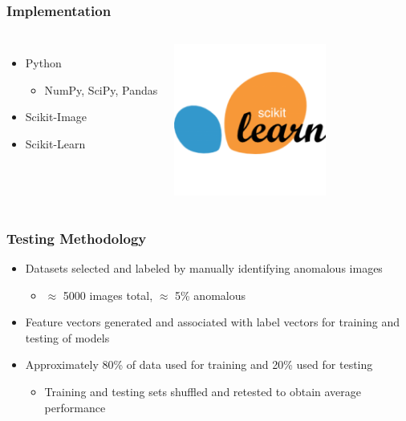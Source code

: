 \documentclass{beamer}
\begin{document}
\begin{frame}
\frametitle{Implementation}
\begin{columns}
\begin{itemize}
  \item Python
  \begin{itemize}
    \item NumPy, SciPy, Pandas
  \end{itemize}
  \item Scikit-Image
  \item Scikit-Learn
\end{itemize}
\includegraphics[width = 5cm]{Figures/scikit}
\end{columns}
\end{frame}


\begin{frame}
\frametitle{Testing Methodology}
\begin{itemize}
  \item Datasets selected and labeled by manually identifying anomalous images
  \begin{itemize}
    \item $\approx$ 5000 images total, $\approx$ 5\% anomalous
  \end{itemize}
  \item Feature vectors generated and associated with label vectors for training and testing of models
  \item Approximately 80\% of data used for training and 20\% used for testing
  \begin{itemize}
    \item Training and testing sets shuffled and retested to obtain average performance
  \end{itemize}
\end{itemize}
\end{frame}
\end{document}
